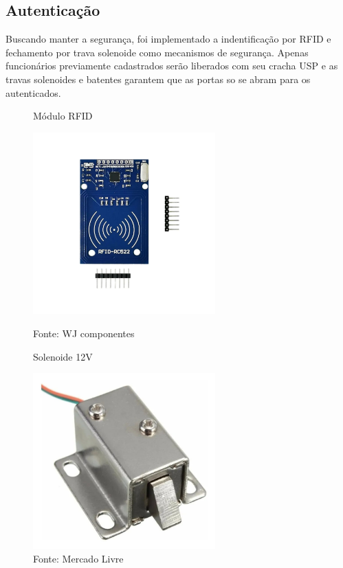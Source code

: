 \documentclass[../poliXuniversity_hospital_(USP)_report.tex]{subfiles}
\begin{document}
\subsection{Autenticação}

Buscando manter a segurança, foi implementado a indentificação por RFID e fechamento por trava solenoide como mecanismos de segurança. Apenas funcionários previamente cadastrados serão liberados com seu cracha USP e as travas solenoides e batentes garantem que as portas so se abram para os autenticados.
\begin{figure}[h]
\centering
    \begin{minipage}{0.5\textwidth}
        \centering
        \caption{Módulo RFID}
        \centering %
        \includegraphics[width=7cm]{images/rfid.jpg}
        \caption*{Fonte: WJ componentes}
        \label{figura: Módulo RFID}
        
    \end{minipage}\hfill
    \begin{minipage}{0.5\textwidth}
    
        \centering
        \caption{Solenoide 12V}
        \centering %
        \includegraphics[width=7cm]{images/solenoide .jpg}
        \caption*{Fonte: Mercado Livre}
        \label{figura: Solenoide 12V}
        
    \end{minipage}\hfill
\end{figure}
\end{document}
